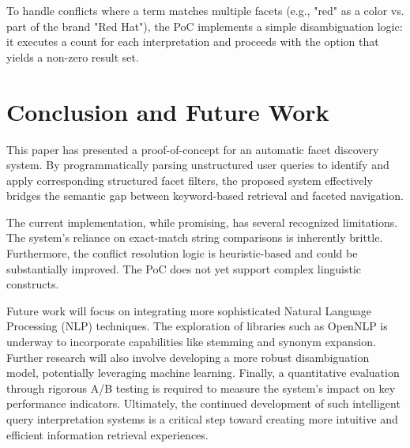 \documentclass{article}
\begin{document}
    To handle conflicts where a term matches multiple facets (e.g., "red" as a color vs. part of the brand "Red Hat"), the PoC implements a simple disambiguation logic: it executes a count for each interpretation and proceeds with the option that yields a non-zero result set.

    \section{Conclusion and Future Work}

    This paper has presented a proof-of-concept for an automatic facet discovery system. By programmatically parsing unstructured user queries to identify and apply corresponding structured facet filters, the proposed system effectively bridges the semantic gap between keyword-based retrieval and faceted navigation.

    The current implementation, while promising, has several recognized limitations. The system's reliance on exact-match string comparisons is inherently brittle. Furthermore, the conflict resolution logic is heuristic-based and could be substantially improved. The PoC does not yet support complex linguistic constructs.

    Future work will focus on integrating more sophisticated Natural Language Processing (NLP) techniques. The exploration of libraries such as OpenNLP is underway to incorporate capabilities like stemming and synonym expansion. Further research will also involve developing a more robust disambiguation model, potentially leveraging machine learning. Finally, a quantitative evaluation through rigorous A/B testing is required to measure the system's impact on key performance indicators. Ultimately, the continued development of such intelligent query interpretation systems is a critical step toward creating more intuitive and efficient information retrieval experiences.
\end{document}
